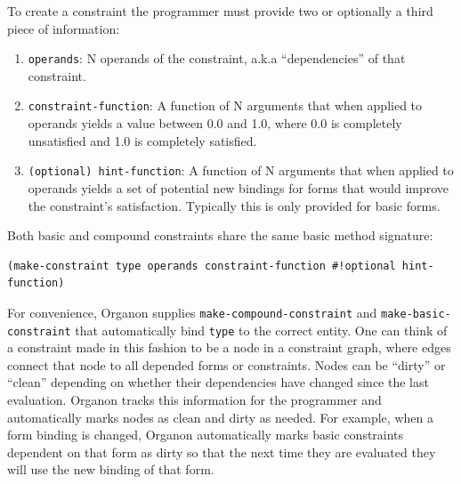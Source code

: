 \documentclass[12pt,a4paper]{article}
\begin{document}
To create a constraint the programmer must provide two or optionally a third piece of information:
\begin{enumerate}

\item \texttt{operands}: N operands of the constraint, a.k.a ``dependencies'' of that constraint.
\item \texttt{constraint-function}: A function of N arguments that when applied to operands yields a value between 0.0 and 1.0, where 0.0 is completely unsatisfied and 1.0 is completely satisfied.
\item \texttt{(optional) hint-function}: A function of N arguments that when applied to operands yields a set of potential new bindings for forms that would improve the constraint's satisfaction.  Typically this is only provided for basic forms.

\end{enumerate}
Both basic and compound constraints share the same basic method signature:
\begin{lstlisting}
(make-constraint type operands constraint-function #!optional hint-function)

\end{lstlisting}
For convenience, Organon supplies \texttt{make-compound-constraint} and \texttt{make-basic-constraint} that automatically bind \texttt{type} to the correct entity. One can think of a constraint made in this fashion to be a node in a constraint graph, where edges connect that node to all depended forms or constraints.  Nodes can be ``dirty'' or ``clean'' depending on whether their dependencies have changed since the last evaluation.  Organon tracks this information for the programmer and automatically marks nodes as clean and dirty as needed.  For example, when a form binding is changed, Organon automatically marks basic constraints dependent on that form as dirty so that the next time they are evaluated they will use the new binding of that form.
\end{document}
